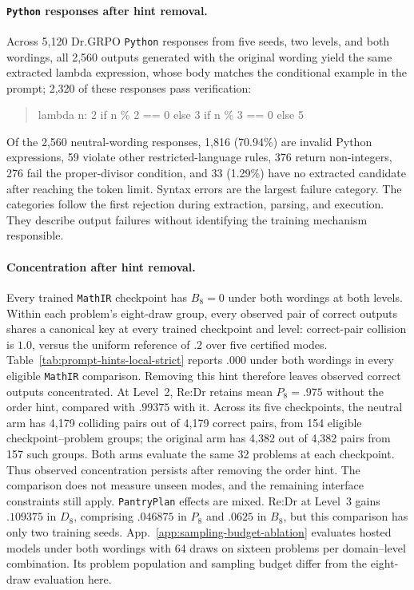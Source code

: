 \paragraph{\texttt{Python} responses after hint removal.}
Across 5,120 Dr.GRPO \texttt{Python} responses from five seeds, two levels, and both
wordings, all 2,560 outputs generated with the original wording yield the
same extracted lambda expression, whose body matches the conditional
example in the prompt; 2,320 of these
responses pass verification:
\begin{quote}\footnotesize\ttfamily
lambda n: 2 if n \% 2 == 0 else 3 if n \% 3 == 0 else 5
\end{quote}
\begin{samepage}
Of the 2,560 neutral-wording responses, 1,816 (70.94\%) are invalid Python
expressions, 59 violate other restricted-language rules, 376 return
non-integers, 276 fail the proper-divisor condition, and 33 (1.29\%) have
no extracted candidate after reaching the token limit. Syntax errors are
the largest failure category. The categories follow the first rejection
during extraction, parsing, and execution. They describe output failures
without identifying the training mechanism responsible.

\end{samepage}

\paragraph{Concentration after hint removal.}
Every trained \texttt{MathIR} checkpoint has $B_8=0$ under both wordings at both levels.
Within each problem's eight-draw group, every observed pair of correct
outputs shares a canonical key at every trained checkpoint and level:
correct-pair collision is $1.0$, versus the
uniform reference of $.2$ over five certified modes.
Table~\ref{tab:prompt-hints-local-strict} reports \pmd{} $.000$ under both
wordings in every eligible \texttt{MathIR} comparison. Removing this hint therefore leaves
observed correct outputs concentrated. At Level~2, Re:Dr retains mean $P_8=.975$ without the order hint, compared with $.99375$
with it. Across its five checkpoints, the neutral arm has 4,179 colliding
pairs out of 4,179 correct pairs, from 154 eligible checkpoint--problem
groups; the original arm has 4,382 out of 4,382 pairs from 157 such groups.
Both arms evaluate the same 32 problems at each checkpoint. Thus observed concentration persists after removing the order hint.
The comparison does not measure unseen modes, and the remaining interface
constraints still apply.
\texttt{PantryPlan} effects are mixed. Re:Dr at Level~3 gains $.109375$ in $D_8$,
comprising $.046875$ in $P_8$ and $.0625$ in $B_8$, but this comparison has only
two training seeds. App.~\ref{app:sampling-budget-ablation} evaluates
hosted models under both wordings with 64 draws on sixteen problems per
domain--level combination. Its problem population and sampling budget
differ from the eight-draw evaluation here.


